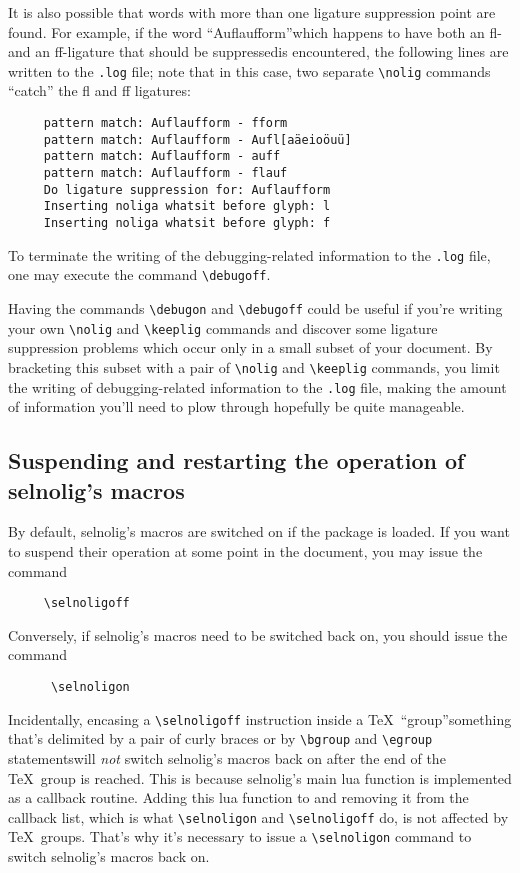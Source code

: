 \documentclass[12pt]{article}
\newcommand{\pkg}[1]{\textsf{#1}}
\newcommand{\opt}[1]{\texttt{#1}}
\newcommand{\cmmd}[1]{\texttt{\textbackslash #1}}
\begin{document}
It is also possible that words with more than one ligature suppression point are found. For example, if the word \enquote{Auflaufform}\textemdash which happens to have both an fl- and an ff-ligature that should be suppressed\textemdash is encountered, the following lines are written to the \opt{.log} file; note that in this case, two separate \cmmd{nolig} commands \enquote{catch} the fl and ff ligatures:
\begin{Verbatim}
     pattern match: Auflaufform - fform
     pattern match: Auflaufform - Aufl[aäeioöuü]
     pattern match: Auflaufform - auff
     pattern match: Auflaufform - flauf
     Do ligature suppression for: Auflaufform
     Inserting noliga whatsit before glyph: l
     Inserting noliga whatsit before glyph: f
\end{Verbatim}


To terminate the writing of the debugging-related information to the \opt{.log} file, one may execute the command \cmmd{debugoff}.

Having the commands \cmmd{debugon} and \cmmd{debugoff} could be useful if you're writing your own \cmmd{nolig} and \cmmd{keeplig} commands and discover some ligature suppression problems which occur only in a small subset of your document. By bracketing this subset with a pair of \cmmd{nolig} and \cmmd{keeplig} commands, you limit the writing of debugging-related information to the \opt{.log} file, making the amount of information you'll need to plow through hopefully be quite manageable.

\subsection[Suspending and restarting the operation of selnolig's macros]{Suspending and restarting the operation of \pkg{selnolig}'s macros}

By default, \pkg{selnolig}'s macros are switched on if the package is loaded. If you want to suspend their operation at some point in the document, you may issue the command
\begin{Verbatim}
     \selnoligoff
\end{Verbatim}
Conversely, if \pkg{selnolig}'s macros need to be switched back on, you should issue the command
\begin{Verbatim}
      \selnoligon
\end{Verbatim}

Incidentally, encasing a \cmmd{selnoligoff} instruction inside a \TeX\ \enquote{group}\textemdash something that's delimited by a pair of curly braces or by \cmmd{bgroup} and \cmmd{egroup} statements\textemdash will \emph{not} switch \pkg{selnolig}'s macros back on after the end of the \TeX\ group is reached. This is because 	\pkg{selnolig}'s main lua function is implemented as a callback routine. Adding this lua function to and removing it from the callback list, which is what  \cmmd{selnoligon} and \cmmd{selnoligoff} do, is not affected by \TeX\ groups. That's why it's necessary to issue a \cmmd{selnoligon} command to switch  \pkg{selnolig}'s macros back on.
\end{document}
